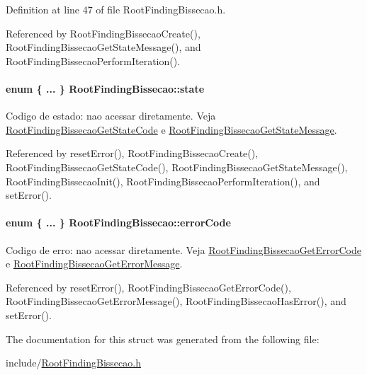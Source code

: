 Definition at line 47 of file RootFindingBissecao.h.

Referenced by RootFindingBissecaoCreate(), RootFindingBissecaoGetStateMessage(), and RootFindingBissecaoPerformIteration().\hypertarget{structRootFindingBissecao_313716e085ac144a01b911d1e2666cd0}{
\paragraph[state]{\setlength{\rightskip}{0pt plus 5cm}enum \{ ... \}   {\bf RootFindingBissecao::state}}\hfill}
\label{structRootFindingBissecao_313716e085ac144a01b911d1e2666cd0}


Codigo de estado: nao acessar diretamente. Veja \hyperlink{group____bissecao_g2ab4fb7daf5901001d011ee85dc4cfe0}{RootFindingBissecaoGetStateCode} e \hyperlink{group____bissecao_gb0455a1f4f30b2e8916d9dff5c237be1}{RootFindingBissecaoGetStateMessage}. 



Referenced by resetError(), RootFindingBissecaoCreate(), RootFindingBissecaoGetStateCode(), RootFindingBissecaoGetStateMessage(), RootFindingBissecaoInit(), RootFindingBissecaoPerformIteration(), and setError().\hypertarget{structRootFindingBissecao_a184500b7a23507c3ea2e270e455a4c0}{
\paragraph[errorCode]{\setlength{\rightskip}{0pt plus 5cm}enum \{ ... \}   {\bf RootFindingBissecao::errorCode}}\hfill}
\label{structRootFindingBissecao_a184500b7a23507c3ea2e270e455a4c0}


Codigo de erro: nao acessar diretamente. Veja \hyperlink{group____bissecao_g9672d1ca4387db1792f8219968118900}{RootFindingBissecaoGetErrorCode} e \hyperlink{group____bissecao_g77e94d3a9b5999461aabeca3bfe1837a}{RootFindingBissecaoGetErrorMessage}. 



Referenced by resetError(), RootFindingBissecaoGetErrorCode(), RootFindingBissecaoGetErrorMessage(), RootFindingBissecaoHasError(), and setError().

The documentation for this struct was generated from the following file:\begin{CompactItemize}
\item 
include/\hyperlink{RootFindingBissecao_8h}{RootFindingBissecao.h}\end{CompactItemize}
